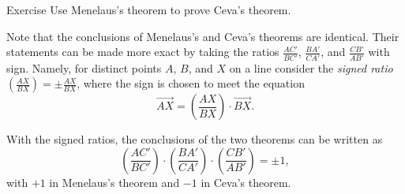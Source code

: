 \begin{thm}{Exercise}\label{ex:ceva-affine}
Use Menelaus's theorem to prove Ceva's theorem.
\end{thm}



Note that the conclusions of Menelaus's and Ceva's theorems are identical.
Their statements can be made more exact by taking the ratios $\frac{AC'}{BC'}$, $\frac{BA'}{CA'}$, and $\frac{CB'}{AB'}$ with sign.
Namely, for distinct points $A$, $B$, and $X$ on a line
consider the \emph{signed ratio} $(\frac{AX}{BX})=\pm\frac{AX}{BX}$, where the sign is chosen to meet the equation
\[\overrightarrow{AX}=\left(\frac{AX}{BX}\right)\cdot \overrightarrow{BX}.\]


With the signed ratios, the conclusions of the two theorems can be written as
\[\left(\frac{AC'}{BC'}\right)\cdot\left(\frac{BA'}{CA'}\right)\cdot \left(\frac{CB'}{AB'}\right)=\pm1,\]
with $+1$ in Menelaus's theorem and $-1$ in Ceva's theorem.

